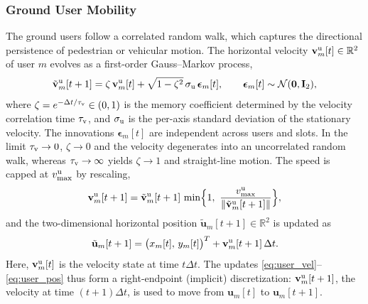 \documentclass[conference]{IEEEtran}
\begin{document}
\subsubsection{Ground User Mobility}\label{sec:user_mobility}
The ground users follow a correlated random walk, which captures the directional persistence of pedestrian or vehicular motion. The horizontal velocity $\mathbf v^{\rm u}_m[t]\in\mathbb R^2$ of user $m$ evolves as a first-order Gauss--Markov process,
\begin{equation}\label{eq:user_vel}
\tilde{\mathbf v}^{\rm u}_m[t+1]=\zeta\,\mathbf v^{\rm u}_m[t]+\sqrt{1-\zeta^{2}}\,\sigma_{\rm u}\,\boldsymbol\epsilon_m[t],\qquad
\boldsymbol\epsilon_m[t]\sim\mathcal N(\mathbf 0,\mathbf I_2),
\end{equation}
where $\zeta=e^{-\Delta t/\tau_{\rm v}}\in(0,1)$ is the memory coefficient determined by the velocity correlation time $\tau_{\rm v}$, and $\sigma_{\rm u}$ is the per-axis standard deviation of the stationary velocity. The innovations $\boldsymbol\epsilon_m[t]$ are independent across users and slots. In the limit $\tau_{\rm v}\to0$, $\zeta\to0$ and the velocity degenerates into an uncorrelated random walk, whereas $\tau_{\rm v}\to\infty$ yields $\zeta\to1$ and straight-line motion. The speed is capped at $v^{\rm u}_{\max}$ by rescaling,
\begin{equation}\label{eq:user_clip}
\mathbf v^{\rm u}_m[t+1]=\tilde{\mathbf v}^{\rm u}_m[t+1]\,\min\!\Big\{1,\ \frac{v^{\rm u}_{\max}}{\|\tilde{\mathbf v}^{\rm u}_m[t+1]\|}\Big\},
\end{equation}
and the two-dimensional horizontal position $\tilde{\mathbf u}_m[t+1]\in\mathbb R^2$ is updated as
\begin{equation}\label{eq:user_pos}
\tilde{\mathbf u}_m[t+1]=\big(x_m[t],\,y_m[t]\big)^T+\mathbf v^{\rm u}_m[t+1]\,\Delta t.
\end{equation}
Here, $\mathbf v^{\rm u}_m[t]$ is the velocity state at time $t\Delta t$. The updates \eqref{eq:user_vel}--\eqref{eq:user_pos} thus form a right-endpoint (implicit) discretization: $\mathbf v^{\rm u}_m[t+1]$, the velocity at time $(t+1)\Delta t$, is used to move from $\mathbf u_m[t]$ to $\mathbf u_m[t+1]$.
\end{document}
